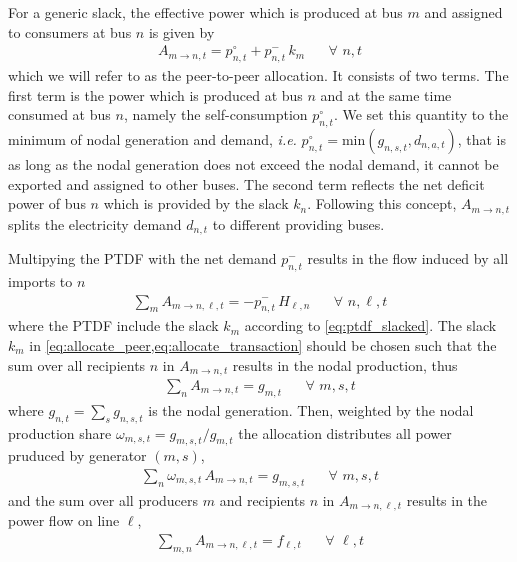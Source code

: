 \documentclass[11pt]{article}
\newcommand{\ie}{\textit{i.e.} }
\newcommand{\generation}[1][n]{g_{#1,s,t}}
\newcommand{\generationshare}[1][n]{\omega_{#1,s,t}}
\newcommand{\generationnodal}[1][n]{g_{#1,t}}
\newcommand{\demand}[1][n]{d_{#1,a,t}}
\newcommand{\demandnodal}[1][n]{d_{#1,t}}
\newcommand{\ptdf}[1][n]{H_{\ell,#1}}
\newcommand{\slack}[1][n]{k_{#1}}
\newcommand{\flow}{f_{\ell,t}}
\newcommand{\netconsumption}[1][n]{p^{-}_{#1,t}}
\newcommand{\selfconsumption}[1][n]{p^{\circ}_{#1,t}}
\newcommand{\allocatePeer}[1][m \rightarrow n]{A_{#1,t}}
\newcommand{\allocateTransaction}[1][m \rightarrow n]{A_{#1,\ell,t}}
\newcommand{\Forall}[1]{\hspace{20pt} \forall \,\, #1 }
\begin{document}
For a generic slack, the effective power which is produced at bus $m$ and assigned to consumers at bus $n$ is given by
\begin{align}
 \allocatePeer = \selfconsumption + \netconsumption \, \slack[m]   \Forall{n,t}
 \label{eq:allocate_peer}
\end{align}
which we will refer to as the peer-to-peer allocation. It consists of two terms. The first term is the power which is produced at bus $n$ and at the same time consumed at bus $n$, namely the self-consumption $\selfconsumption$. We set this quantity to the minimum of nodal generation and demand, \ie $\selfconsumption = \text{min}(\generation, \demand)$, that is as long as the nodal generation does not exceed the nodal demand, it cannot be exported and assigned to other buses. The second term reflects the net deficit power of bus $n$ which is provided by the slack $\slack$. Following this concept, $\allocatePeer$ splits the electricity demand $\demandnodal$ to different providing buses. 

Multipying the PTDF with the net demand $\netconsumption$ results in the flow induced by all imports to $n$
\begin{align}
 \sum_m \allocateTransaction = - \netconsumption  \, \ptdf \Forall{n,\ell,t}
 \label{eq:allocate_transaction}
\end{align}
where the PTDF include the slack $\slack[m]$ according to \cref{eq:ptdf_slacked}. The slack $\slack[m]$ in \cref{eq:allocate_peer,eq:allocate_transaction} should be chosen such that the sum over all recipients $n$ in $\allocatePeer$ results in the nodal production, thus
\begin{align}
 \sum_n \allocatePeer = \generationnodal[m] \Forall{m,s,t}
 \label{eq:generator_sum}
\end{align}
where $\generationnodal = \sum_s \generation$ is the nodal generation.
Then, weighted by the nodal production share $\generationshare[m] = \generation[m]/\generationnodal[m]$ the allocation distributes all power pruduced by generator $(m,s)$,
\begin{align}
  \sum_n \generationshare[m] \, \allocatePeer = \generation[m] \Forall{m,s,t}
  \label{eq:recipients_sum}
\end{align}
and the sum over all producers $m$ and recipients $n$ in $\allocateTransaction$ results in the power flow on line $\ell$,
\begin{align}
 \sum_{m,n} \allocateTransaction = \flow \Forall{\ell,t}
 \label{eq:transaction_sum}
\end{align}
\\
\end{document}
